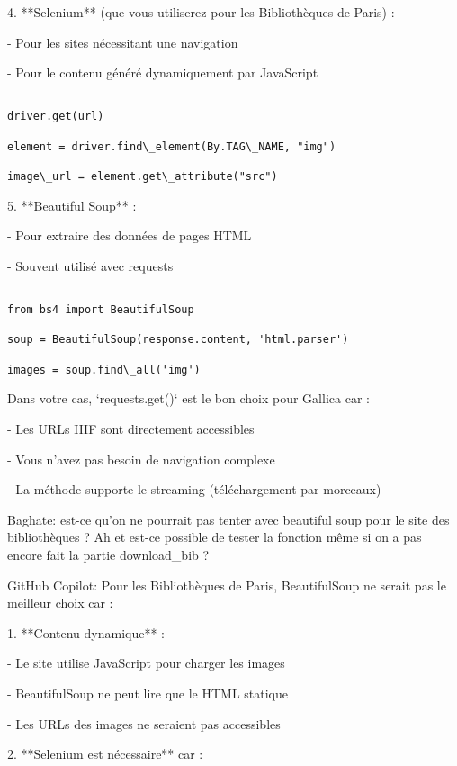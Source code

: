 4. **Selenium** (que vous utiliserez pour les Bibliothèques de Paris) :

- Pour les sites nécessitant une navigation

- Pour le contenu généré dynamiquement par JavaScript

\begin{verbatim}

driver.get(url)

element = driver.find\_element(By.TAG\_NAME, "img")

image\_url = element.get\_attribute("src")

\end{verbatim}

5. **Beautiful Soup** :

- Pour extraire des données de pages HTML

- Souvent utilisé avec requests

\begin{verbatim}

from bs4 import BeautifulSoup

soup = BeautifulSoup(response.content, 'html.parser')

images = soup.find\_all('img')

\end{verbatim}

Dans votre cas, `requests.get()` est le bon choix pour Gallica car :

- Les URLs IIIF sont directement accessibles

- Vous n'avez pas besoin de navigation complexe

- La méthode supporte le streaming (téléchargement par morceaux)

Baghate: est-ce qu'on ne pourrait pas tenter avec beautiful soup pour le site des bibliothèques ? Ah et est-ce possible de tester la fonction même si on a pas encore fait la partie download\_bib ?

GitHub Copilot: Pour les Bibliothèques de Paris, BeautifulSoup ne serait pas le meilleur choix car :

1. **Contenu dynamique** :

- Le site utilise JavaScript pour charger les images

- BeautifulSoup ne peut lire que le HTML statique

- Les URLs des images ne seraient pas accessibles

2. **Selenium est nécessaire** car :

